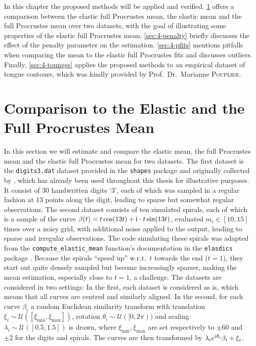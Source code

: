 \label{sec:4}
In this chapter the proposed methods will be applied and verified.
\cref{sec:4-means} offers a comparison between the elastic full Procrustes mean, the elastic mean and the full Procrustes mean over two datasets, with the goal of illustrating some properties of the elastic full Procrustes mean.
\cref{sec:4-penalty} briefly discusses the effect of the penalty parameter on the estimation.
\cref{sec:4-pfits} mentions pitfalls when comparing the mean to the elastic full Procrustes fits and discusses outliers.
Finally, \cref{sec:4-tounges} applies the proposed methods to an empirical dataset of tongue contours, which was kindly provided by Prof.\ Dr.\ Marianne \textsc{Pouplier}.


\section{Comparison to the Elastic and the Full Procrustes Mean}
\label{sec:4-means}
In this section we will estimate and compare the elastic mean, the full Procrustes mean and the elastic full Procrustes mean for two datasets.
The first dataset is the \texttt{digits3.dat} dataset provided in the \texttt{shapes} package \parencite{shapes} and originally collected by \cite{Anderson1997}, which has already been used throughout this thesis for illustrative purposes.
It consist of 30 handwritten digits \enquote*{3}, each of which was sampled in a regular fashion at 13 points along the digit, leading to sparse but somewhat regular observations.
The second dataset consists of ten simulated spirals, each of which is a sample of the curve $\beta(t) = t \cos(13t) + \mathrm{i}\mkern1mu \cdot t \sin(13t)$, evaluated $m_i \in [10,15]$ times over a noisy grid, with additional noise applied to the output, leading to sparse and irregular observations.
The code simulating these spirals was adapted from the \texttt{compute\_elastic\_mean} function's documentation in the \texttt{elasdics} package \parencite{elasdics}.
Because the spirals \enquote{speed up} w.r.t.\ $t$ towards the end ($t = 1$), they start out quite densely sampled but become increasingly sparser, making the mean estimation, especially close to $t=1$, a challenge.
The datasets are considered in two settings:
In the first, each dataset is considered as is, which means that all curves are centred and similarly aligned.
In the second, for each curve $\beta_i$ a random Euclidean similarity transform with translation $\xi_i \sim \mathcal{U}([\xi_\mathrm{min}, \xi_\mathrm{max}])$, rotation $\theta_i \sim \mathcal{U}([0,2\pi))$ and scaling $\lambda_i \sim \mathcal{U}([0.5,1.5])$ is drawn, where $\xi_\mathrm{min}, \xi_\mathrm{max}$ are set respectively to $\pm 60$ and $\pm 2$ for the digits and spirals.
The curves are then transformed by $\lambda_i e^{\mathrm{i}\mkern1mu \theta_i} \beta_i + \xi_i$.

